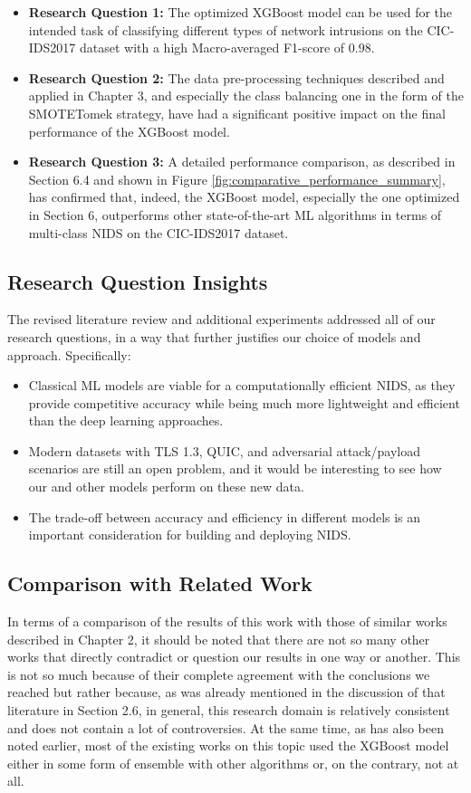 \begin{itemize}
	\item \textbf{Research Question 1: } The optimized XGBoost model can be used for the intended task of classifying different types of network intrusions on the CIC-IDS2017 dataset with a high Macro-averaged F1-score of $0.98$.
	\item \textbf{Research Question 2: } The data pre-processing techniques described and applied in Chapter 3, and especially the class balancing one in the form of the SMOTETomek strategy, have had a significant positive impact on the final performance of the XGBoost model.
	\item \textbf{Research Question 3: } A detailed performance comparison, as described in Section 6.4 and shown in Figure \ref{fig:comparative_performance_summary}, has confirmed that, indeed, the XGBoost model, especially the one optimized in Section 6, outperforms other state-of-the-art ML algorithms in terms of multi-class NIDS on the CIC-IDS2017 dataset.
\end{itemize}

\subsection{Research Question Insights} 
The revised literature review and additional experiments addressed all of our research questions, in a way that further justifies our choice of models and approach. Specifically: 
\begin{itemize} 
	\item Classical ML models are viable for a computationally efficient NIDS, as they provide competitive accuracy while being much more lightweight and efficient than the deep learning approaches.
	\item Modern datasets with TLS 1.3, QUIC, and adversarial attack/payload scenarios are still an open problem, and it would be interesting to see how our and other models perform on these new data.
	\item The trade-off between accuracy and efficiency in different models is an important consideration for building and deploying NIDS.
\end{itemize} 

\subsection{Comparison with Related Work}

In terms of a comparison of the results of this work with those of similar works described in Chapter 2, it should be noted that there are not so many other works that directly contradict or question our results in one way or another. This is not so much because of their complete agreement with the conclusions we reached but rather because, as was already mentioned in the discussion of that literature in Section 2.6, in general, this research domain is relatively consistent and does not contain a lot of controversies. At the same time, as has also been noted earlier, most of the existing works on this topic used the XGBoost model either in some form of ensemble with other algorithms or, on the contrary, not at all.

